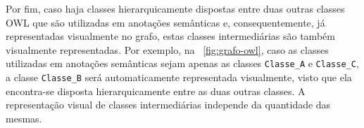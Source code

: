Por fim, caso haja classes hierarquicamente dispostas entre duas outras classes OWL que são utilizadas em anotações semânticas e, consequentemente, já representadas visualmente no grafo, estas classes intermediárias são também visualmente representadas. Por exemplo, na \figurename~\ref{fig:grafo-owl}, caso as classes utilizadas em anotações semânticas sejam apenas as classes \texttt{Classe\_A} e \texttt{Classe\_C}, a classe \texttt{Classe\_B} será automaticamente representada visualmente, visto que ela encontra-se disposta hierarquicamente entre as duas outras classes. A representação visual de classes intermediárias independe da quantidade das mesmas.

